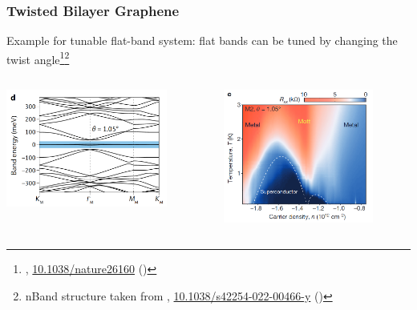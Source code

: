 \documentclass[aspectratio=169]{beamer}
\begin{document}
\begin{frame}
	\frametitle{Twisted Bilayer Graphene}
	
	Example for tunable flat-band system: flat bands can be tuned by changing the twist angle\footnote[frame]{\citeauthor{caoUnconventionalSuperconductivityMagicangle2018},  \href{https://doi.org/10.1038/nature26160}{10.1038/nature26160} (\citeyear{caoUnconventionalSuperconductivityMagicangle2018})}\footnote[frame]{nBand structure taken from \citeauthor{tormaSuperconductivitySuperfluidityQuantum2022},  \href{https://doi.org/10.1038/s42254-022-00466-y}{10.1038/s42254-022-00466-y} (\citeyear{tormaSuperconductivitySuperfluidityQuantum2022})}
	
	\begin{columns}[T]
		\begin{column}{0.5\textwidth}
			\begin{center}
				\includegraphics[width=0.8\textwidth]{figs/TBG band structure}
			\end{center}
		\end{column}
		\begin{column}{0.5\textwidth}
			\begin{center}
				\includegraphics[width=0.8\textwidth]{figs/TBG SC experiment}
			\end{center}
		\end{column}
	\end{columns}
\end{frame}
\end{document}
